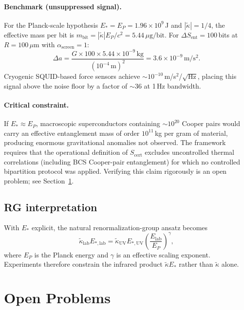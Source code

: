 \documentclass[11pt]{article}
\theoremstyle{plain}
\theoremstyle{definition}
\theoremstyle{remark}
\begin{document}
\paragraph{Benchmark (unsuppressed signal).}
For the Planck-scale hypothesis $E_* = E_P = 1.96\times10^9$\,J and $|\tilde{\kappa}| = 1/4$, the
effective mass per bit is $m_{\mathrm{bit}} = |\tilde{\kappa}|E_P/c^2 = 5.44\,\mu\mathrm{g/bit}$.
For $\Delta S_{\mathrm{ent}} = 100$\,bits at $R = 100\,\mu\mathrm{m}$ with $\alpha_{\mathrm{screen}} = 1$:
\begin{equation}
\Delta a
= \frac{G \times 100 \times 5.44\times10^{-9}\,\mathrm{kg}}{(10^{-4}\,\mathrm{m})^2}
= 3.6\times10^{-9}\,\mathrm{m/s^2}.
\end{equation}
Cryogenic SQUID-based force sensors achieve $\sim 10^{-10}$\,m/s$^2$/\hspace{0.5pt}$\sqrt{\mathrm{Hz}}$,
placing this signal above the noise floor by a factor of $\sim\!36$ at 1\,Hz bandwidth.

\paragraph{Critical constraint.}
If $E_* \approx E_P$, macroscopic superconductors containing $\sim\!10^{20}$ Cooper pairs would
carry an effective entanglement mass of order $10^{11}$\,kg per gram of material, producing
enormous gravitational anomalies not observed. The framework requires that the operational
definition of $S_{\mathrm{cert}}$ excludes uncontrolled thermal correlations (including BCS
Cooper-pair entanglement) for which no controlled bipartition protocol was applied. Verifying
this claim rigorously is an open problem; see Section~\ref{sec:open-problems}.

\subsection{RG interpretation}

With $E_*$ explicit, the natural renormalization-group ansatz becomes
\begin{equation}
\tilde{\kappa}_{\mathrm{lab}}E_{*,\mathrm{lab}} = \tilde{\kappa}_{\mathrm{UV}}E_{*,\mathrm{UV}}\left(\frac{E_{\mathrm{lab}}}{E_P}\right)^\gamma,
\end{equation}
where $E_P$ is the Planck energy and $\gamma$ is an effective scaling exponent. Experiments therefore constrain the infrared product $\tilde{\kappa}E_*$ rather than $\tilde{\kappa}$ alone.

\section{Open Problems}\label{sec:open-problems}
\end{document}
